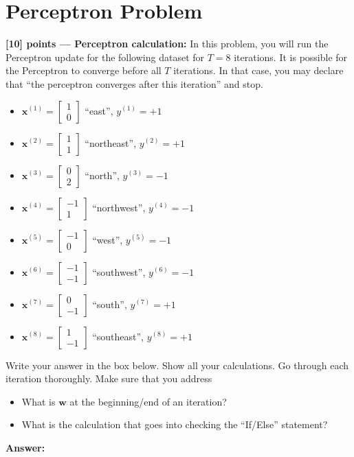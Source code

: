 \documentclass{article}
\begin{document}
\section{Perceptron Problem}
\noindent\textbf{[10] points --- Perceptron calculation:} In this problem, you will run the Perceptron update for the following dataset for \(T = 8\) iterations. It is possible for the Perceptron to converge before all \(T\) iterations. In that case, you may declare that ``the perceptron converges after this iteration'' and stop.
\begin{itemize}
  \item $\mathbf{x}^{(1)} = \begin{bmatrix} 1 \\ 0 \end{bmatrix}$ \quad ``east'',
        \quad $y^{(1)} = +1$
    \item $\mathbf{x}^{(2)} = \begin{bmatrix} 1 \\ 1 \end{bmatrix}$ \quad ``northeast'',
        \quad $y^{(2)} = +1$
    \item $\mathbf{x}^{(3)} = \begin{bmatrix} 0 \\ 2 \end{bmatrix}$ \quad ``north'',
        \quad $y^{(3)} = -1$
    \item $\mathbf{x}^{(4)} = \begin{bmatrix} -1 \\ 1 \end{bmatrix}$ \quad ``northwest'',
        \quad $y^{(4)} = -1$
    \item $\mathbf{x}^{(5)} = \begin{bmatrix} -1 \\ 0 \end{bmatrix}$ \quad ``west'',
        \quad $y^{(5)} = -1$
    \item $\mathbf{x}^{(6)} = \begin{bmatrix} -1 \\ -1 \end{bmatrix}$ \quad ``southwest'',
        \quad $y^{(6)} = -1$
    \item $\mathbf{x}^{(7)} = \begin{bmatrix} 0 \\ -1 \end{bmatrix}$ \quad ``south'',
        \quad $y^{(7)} = +1$
    \item $\mathbf{x}^{(8)} = \begin{bmatrix} 1 \\ -1 \end{bmatrix}$ \quad ``southeast'',
        \quad $y^{(8)} = +1$
\end{itemize}
Write your answer in the box below. Show all your calculations.
Go through each iteration thoroughly.
Make sure that you address
\begin{itemize}
  \item
What is $\mathbf{w}$ at the beginning/end of an iteration?
  \item What is the calculation that goes into checking the ``If/Else'' statement?

\end{itemize}

\begin{tcolorbox}{}
\textbf{Answer: }


\end{tcolorbox}
\end{document}
